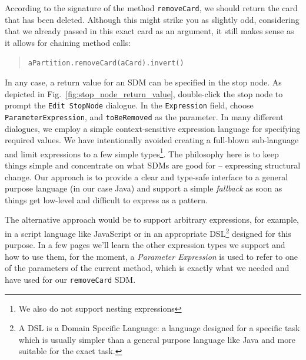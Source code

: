 According to the signature of the method \texttt{removeCard}, we should return
the card that has been deleted.  Although this might strike you as slightly odd,
considering that we already passed in this exact card as an argument, it still
makes sense as it allows for chaining method calls:
\begin{quote}\texttt{aPartition.removeCard(aCard).invert()}\end{quote}
In any case, a return value for an SDM can be specified in the stop node.
As depicted in Fig.~\ref{fig:stop_node_return_value}, double-click the stop
node to prompt the \texttt{Edit StopNode} dialogue.
In the \texttt{Expression} field, choose \texttt{ParameterExpression}, and
\texttt{toBeRemoved} as the parameter.  In many different dialogues, we employ a
simple context-sensitive expression language for specifying required values.  We
have intentionally avoided creating a full-blown sub-language and limit
expressions to a few simple types\footnote{We also do not support nesting
expressions}.  The philosophy here is to keep things simple and concentrate on
what SDMs are good for -- expressing structural change.  Our approach is to
provide a clear and type-safe interface to a general purpose language (in our
case Java) and support a simple \emph{fallback} as soon as things get low-level
and difficult to express as a pattern.  

The alternative approach would be to
support arbitrary expressions, for example, in a script language like
JavaScript or in an appropriate DSL\footnote{A DSL is a Domain Specific
Language: a language designed for a specific task which is usually simpler
than a general purpose language like Java and more suitable for the exact task.}
designed for this purpose. In a few pages we'll learn the other expression types
we support and how to use them, for the moment, a \emph{Parameter Expression} is
used to refer to one of the parameters of the current method, which is exactly
what we needed and have used for our \texttt{removeCard} SDM.
 
